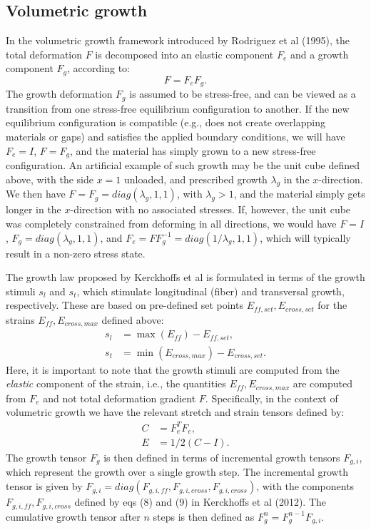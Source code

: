\documentclass[a4paper,10pt]{article}
\begin{document}
\subsection{Volumetric growth}
In the volumetric growth framework introduced by 
Rodriguez et al (1995), the total deformation $F$ is decomposed into an elastic component $F_e$ and a growth
component $F_g$, according to:
\[
  F = F_e F_g . 
\]
The growth deformation $F_g$ is assumed to be stress-free, and can be viewed as a transition from one stress-free 
equilibrium configuration to another. If the new equilibrium configuration is compatible (e.g., does not create
overlapping materials or gaps) and satisfies the applied boundary conditions, we will have $F_e = I$, $F=F_g$, and the
material has simply grown to a new stress-free configuration. An artificial example of such growth may be the unit cube 
defined above, with the side $x=1$ unloaded, and prescribed growth $\lambda_g$ in the $x$-direction. 
We then have $F=F_g= diag(\lambda_g, 1, 1)$, with $\lambda_g > 1$, and the
material simply gets longer in the $x$-direction with no associated stresses. If, however, the unit cube was completely 
constrained from deforming in all directions, we would have $F = I$, $F_g= diag(\lambda_g, 1, 1)$, and 
$F_e = F F_g^{-1} = diag(1/\lambda_g, 1, 1)$, which will typically result in a non-zero stress state. 

The growth law proposed by Kerckhoffs et al is formulated in terms of the growth stimuli $s_l$ and $s_t$, 
which stimulate longitudinal (fiber) and transversal growth, respectively. These are based on pre-defined
set points $E_{ff,set}, E_{cross,set}$ for the strains $E_{ff}, E_{cross,max}$ defined above:
\begin{align}
  s_l &= \max(E_{ff}) - E_{ff,set}, \label{stim0}\\
  s_t &= \min(E_{cross,max}) - E_{cross,set} . \label{stim1}
\end{align}
Here, it is important to note that the growth stimuli are computed from the \emph{elastic} component of the strain,
i.e., the quantities $E_{ff}, E_{cross,max}$ are computed from $F_e$ and not total deformation gradient $F$. 
Specifically, in the context of volumetric growth we have the relevant stretch and strain tensors defined by:
\begin{align*}
  C &= F_e^TF_e ,\\
  E &= 1/2(C - I) .
\end{align*}
The growth tensor $F_g$ is then defined in terms of incremental growth tensors $F_{g,i}$, which represent the
growth over a single growth step. The incremental growth tensor is given  
by $F_{g,i}= diag(F_{g,i,ff}, F_{g,i,cross}, F_{g,i,cross})$, with the components 
$F_{g,i,ff}, F_{g,i,cross}$ defined by eqs (8) and (9) in Kerckhoffs et al (2012). The cumulative growth tensor
after $n$ steps is then defined as $F_g^n = F_g^{n-1} F_{g,i}$.
\end{document}

